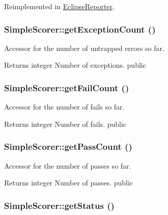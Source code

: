 Reimplemented in \hyperlink{class_eclipse_reporter_a251879a7dcdbaf023091c18dce8d58f2}{EclipseReporter}.\hypertarget{class_simple_scorer_a85d6400743d679e59d2a276ce8be05ac}{
\subsubsection[{getExceptionCount}]{\setlength{\rightskip}{0pt plus 5cm}SimpleScorer::getExceptionCount ()}}
\label{class_simple_scorer_a85d6400743d679e59d2a276ce8be05ac}
Accessor for the number of untrapped errors so far. \begin{DoxyReturn}{Returns}
integer Number of exceptions.  public 
\end{DoxyReturn}
\hypertarget{class_simple_scorer_aecb332848ece06f516351ad030c817d7}{
\subsubsection[{getFailCount}]{\setlength{\rightskip}{0pt plus 5cm}SimpleScorer::getFailCount ()}}
\label{class_simple_scorer_aecb332848ece06f516351ad030c817d7}
Accessor for the number of fails so far. \begin{DoxyReturn}{Returns}
integer Number of fails.  public 
\end{DoxyReturn}
\hypertarget{class_simple_scorer_aa41c54c949beb5344160a13418f8cb8b}{
\subsubsection[{getPassCount}]{\setlength{\rightskip}{0pt plus 5cm}SimpleScorer::getPassCount ()}}
\label{class_simple_scorer_aa41c54c949beb5344160a13418f8cb8b}
Accessor for the number of passes so far. \begin{DoxyReturn}{Returns}
integer Number of passes.  public 
\end{DoxyReturn}
\hypertarget{class_simple_scorer_a0efdf88692ba2649b3f68ab0812781f2}{
\subsubsection[{getStatus}]{\setlength{\rightskip}{0pt plus 5cm}SimpleScorer::getStatus ()}}
